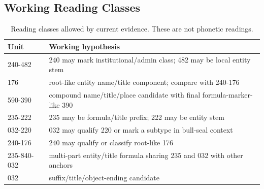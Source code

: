 \subsection{Working Reading Classes}

\begin{table}[htbp]
\centering
\footnotesize
\begin{tabular}{lp{}}
\toprule
\textbf{Unit} & \textbf{Working hypothesis} \\
\midrule
240-482 & 240 may mark institutional/admin class; 482 may be local entity stem \\
176 & root-like entity name/title component; compare with 240-176 \\
590-390 & compound name/title/place candidate with final formula-marker-like 390 \\
235-222 & 235 may be formula/title prefix; 222 may be entity stem \\
032-220 & 032 may qualify 220 or mark a subtype in bull-seal context \\
240-176 & 240 may qualify or classify root-like 176 \\
235-840-032 & multi-part entity/title formula sharing 235 and 032 with other anchors \\
032 & suffix/title/object-ending candidate \\
\bottomrule
\end{tabular}
\caption{Reading classes allowed by current evidence. These are not phonetic readings.}
\end{table}

